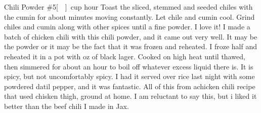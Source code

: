 \begin{recipe}{Chili Powder \#5}{\unit[]{cup}}{ hour}
Toast the sliced, stemmed and seeded chiles with the cumin for about \unit[3--4]{minutes} moving constantly.  Let chile and cumin cool.
Grind chiles and cumin along with other spices until a fine powder.
\freeform I love it!  I made a batch of chicken chili with this chili powder, and it came out very well.  It may be the powder or it may be the fact that it was frozen and reheated.  I froze half and reheated it in a pot with \unit[12]{oz} of black lager.  Cooked on high heat until thawed, then simmered for about an hour to boil off whatever excess liquid there is.  It is spicy, but not uncomfortably spicy.  I had it served over rice last night with some powdered datil pepper, and it was fantastic.  All of this from achicken chili recipe that used chisken thigh, ground at home.  I am reluctant to say this, but i liked it better than the beef chili I made in Jax.
\end{recipe}
